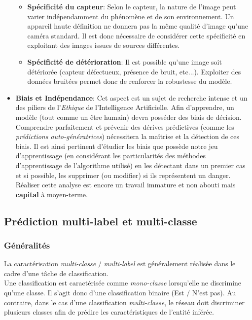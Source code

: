\begin{itemize}
\begin{itemize}
        \item \textbf{Spécificité du capteur}: Selon le capteur, la nature de l'image peut varier indépendamment du phénomène et de son environnement. Un appareil haute définition ne donnera pas la même qualité d'image qu'une caméra standard. Il est donc nécessaire de considérer cette spécificité en exploitant des images issues de sources différentes.
        \item \textbf{Spécificité de détérioration}: Il est possible qu'une image soit détériorée (capteur défectueux, présence de bruit, etc...). Exploiter des données bruitées permet donc de renforcer la robustesse du modèle.
    \end{itemize}
    \item \textbf{Biais et Indépendance}: Cet aspect est un sujet de recherche intense et un des piliers de l'\textit{Ethique} de l'Intelligence Artificielle. Afin d'apprendre, un modèle (tout comme un être humain) devra posséder des biais de décision. Comprendre parfaitement et prévenir des dérives prédictives (comme les \textit{prédictions auto-génératrices}) nécessitera la maîtrise et la détection de ces biais. Il est ainsi pertinent d'étudier les biais que possède notre jeu d'apprentissage (en considérant les particularités des méthodes d'apprentissage de l'algorithme utilisé) en les détectant dans un premier cas et si possible, les supprimer (ou modifier) si ils représentent un danger. Réaliser cette analyse est encore un travail immature et non abouti mais \textbf{capital} à moyen-terme.
\end{itemize}

\subsection{Prédiction multi-label et multi-classe}
\label{multiclasslabel}
\subsubsection{Généralités}
La caractérisation \textit{multi-classe} / \textit{multi-label} est généralement réalisée dans le cadre d'une tâche de classification.\\

\noindent Une classification est caractérisée comme \textit{mono-classe} lorsqu'elle ne discrimine qu'une classe. Il s'agit donc d'une classification binaire (Est / N'est pas). Au contraire, dans le cas d'une classification \textit{multi-classe}, le réseau doit discriminer plusieurs classes afin de prédire les caractéristiques de l'entité inférée.\\


